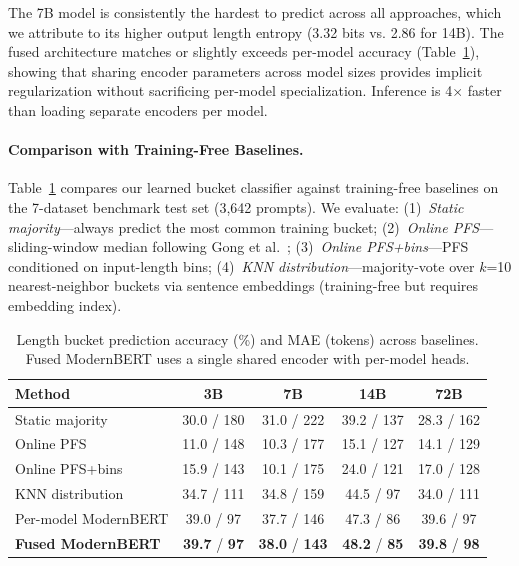 \documentclass[letterpaper, anonymous, twocolumn, 10pt]{article}
\begin{document}
The 7B model is consistently the hardest to predict across all approaches, which we attribute to its higher output length entropy (3.32 bits vs. 2.86 for 14B).
The fused architecture matches or slightly exceeds per-model accuracy (Table~\ref{tab:length_baselines}), showing that sharing encoder parameters across model sizes provides implicit regularization without sacrificing per-model specialization. Inference is 4$\times$ faster than loading separate encoders per model.

\paragraph{Comparison with Training-Free Baselines.}
Table~\ref{tab:length_baselines} compares our learned bucket classifier against training-free baselines on the 7-dataset benchmark test set (3,642 prompts). We evaluate: (1)~\emph{Static majority}---always predict the most common training bucket; (2)~\emph{Online PFS}---sliding-window median following Gong et al.~\cite{Gong_2025}; (3)~\emph{Online PFS+bins}---PFS conditioned on input-length bins; (4)~\emph{KNN distribution}---majority-vote over $k$=10 nearest-neighbor buckets via sentence embeddings (training-free but requires embedding index).

\begin{table}[t]
\centering
\small
\caption{Length bucket prediction accuracy (\%) and MAE (tokens) across baselines. Fused ModernBERT uses a single shared encoder with per-model heads.}
\label{tab:length_baselines}
\begin{tabular}{lcccc}
\hline
Method & 3B & 7B & 14B & 72B \\
\hline
Static majority & 30.0 / 180 & 31.0 / 222 & 39.2 / 137 & 28.3 / 162 \\
Online PFS~\cite{Gong_2025} & 11.0 / 148 & 10.3 / 177 & 15.1 / 127 & 14.1 / 129 \\
Online PFS+bins & 15.9 / 143 & 10.1 / 175 & 24.0 / 121 & 17.0 / 128 \\
KNN distribution & 34.7 / 111 & 34.8 / 159 & 44.5 / 97 & 34.0 / 111 \\
\hline
Per-model ModernBERT & 39.0 / 97 & 37.7 / 146 & 47.3 / 86 & 39.6 / 97 \\
\textbf{Fused ModernBERT} & \textbf{39.7} / \textbf{97} & \textbf{38.0} / \textbf{143} & \textbf{48.2} / \textbf{85} & \textbf{39.8} / \textbf{98} \\
\hline
\end{tabular}
\vspace{-0.5em}
\end{table}
\end{document}
